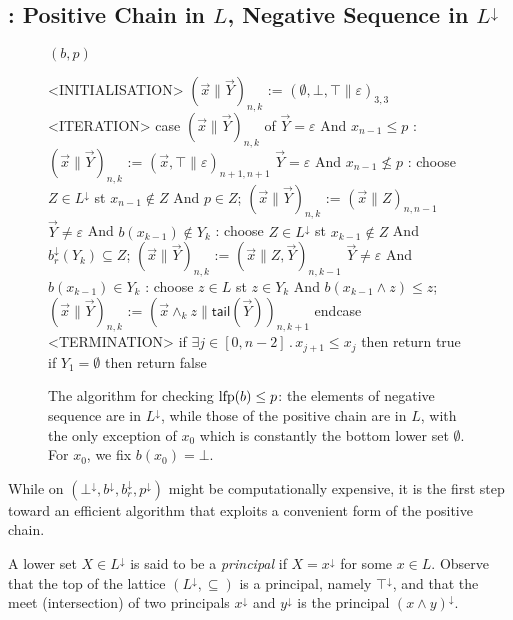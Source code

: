 \subsection{{\ADPDR}: Positive Chain in $L$, Negative Sequence in \texorpdfstring{$L^\downarrow$}{L↓}}\label{sec:pdr:ADPDR}
\begin{figure}[t]
	\begin{center}
		\underline{{\ADPDR} $(b,p)$}
		{\small
			\begin{codeNT}
<INITIALISATION>
  $( \vec{x} \| \vec{Y} )_{n,k}$ := $(\emptyset,\bot,\top\|\varepsilon)_{3,3}$
<ITERATION>
  case $( \vec{x} \| \vec{Y} )_{n,k}$ of								%
	   $\vec{Y}=\varepsilon$ And $x_{n-1} \le p$     :                    %
			$( \vec{x} \| \vec{Y} )_{n,k}$ := $( \vec{x}, \top \| \varepsilon )_{n+1,n+1}$
	   $\vec{Y}=\varepsilon$ And $x_{n-1} \not \le p$    :                     %
			choose $Z\in L^{\downarrow}$ st  $x_{n-1} \not \in Z$ And  $p \in Z$;
			$( \vec{x} \| \vec{Y} )_{n,k}$ := $( \vec{x} \| Z )_{n,n-1}$
	   $\vec{Y} \neq \varepsilon$ And $b(x_{k-1}) \not \in Y_k$ :                        %
			choose $Z\in L^{\downarrow}$ st $x_{k-1} \not \in Z$ And $b^{\downarrow}_r(Y_k) \subseteq Z$;
			$(\vec{x} \| \vec{Y} )_{n,k}$ := $(\vec{x} \| Z , \vec{Y} )_{n,k-1}$
	   $\vec{Y} \neq \varepsilon$ And $b(x_{k-1}) \in Y_k$ :                        %
			choose $z \in L$ st $z \in Y_k$ And $b(x_{k-1} \land z) \le z$;
			$(\vec{x} \| \vec{Y} )_{n,k}$ := $(\vec{x} \land_k z \| \mathsf{tail}(\vec{Y}) )_{n,k+1}$
  endcase
<TERMINATION>
	if $\exists j\in [0,n-2]\,.\, x_{j+1} \le x_j$ then return true		%
	if $Y_1=\emptyset$ then return false							%
\end{codeNT}
		}
	\end{center}
	\caption{The algorithm {\ADPDR} for checking $\text{lfp}(b) \le p$: the elements of negative sequence are in $L^\downarrow$, while those of the positive chain are in $L$, with the only exception of $x_0$ which is constantly the bottom lower set $\emptyset$. For $x_0$, we fix $b(x_0) = \bot$.}
	\label{fig:pdr:adpdr}
\end{figure}

While {\APDR} on $(\bot^\downarrow, b^\downarrow,b_r^{\downarrow}, p^{\downarrow})$ might be computationally expensive, it is the first step toward an efficient algorithm that exploits a convenient form of the positive chain.

A lower set $X\in L^{\downarrow}$ is said to be a \emph{principal} if $X=x^\downarrow$ for some $x\in L$. Observe that the top of the lattice $(L^\downarrow, \subseteq)$ is a principal, namely $\top^\downarrow$, and that the meet (intersection) of two principals $x^\downarrow$ and $y^\downarrow$ is the principal $(x\land y)^\downarrow$.

